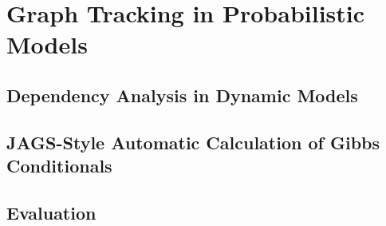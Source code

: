 \chapter{Graph Tracking in Probabilistic Models}
\label{cha:graph-track-prob}

\section{Dependency Analysis in Dynamic Models}
\label{sec:depend-analys-dynam}

\section{JAGS-Style Automatic Calculation of Gibbs Conditionals}
\label{sec:jags-style-automatic}

\section{Evaluation}
\label{sec:evaluation}

